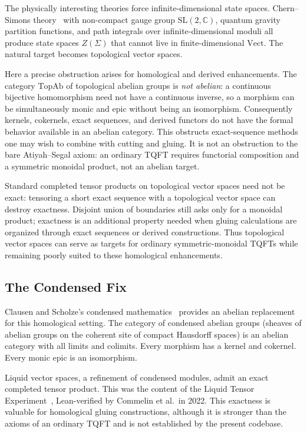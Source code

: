 \documentclass[11pt]{amsart}
\theoremstyle{plain}
\theoremstyle{definition}
\newcommand{\Vect}{\mathrm{Vect}}
\newcommand{\TopAb}{\mathrm{TopAb}}
\begin{document}
The physically interesting theories force infinite-dimensional state spaces. Chern--Simons theory~\cite{Witten1988} with non-compact gauge group $\mathrm{SL}(2,\mathbb{C})$, quantum gravity partition functions, and path integrals over infinite-dimensional moduli all produce state spaces $Z(\Sigma)$ that cannot live in finite-dimensional $\Vect$. The natural target becomes topological vector spaces.

Here a precise obstruction arises for homological and derived enhancements. The category $\TopAb$ of topological abelian groups is \emph{not abelian}: a continuous bijective homomorphism need not have a continuous inverse, so a morphism can be simultaneously monic and epic without being an isomorphism. Consequently kernels, cokernels, exact sequences, and derived functors do not have the formal behavior available in an abelian category. This obstructs exact-sequence methods one may wish to combine with cutting and gluing. It is not an obstruction to the bare Atiyah--Segal axiom: an ordinary TQFT requires functorial composition and a symmetric monoidal product, not an abelian target.

Standard completed tensor products on topological vector spaces need not be exact: tensoring a short exact sequence with a topological vector space can destroy exactness. Disjoint union of boundaries still asks only for a monoidal product; exactness is an additional property needed when gluing calculations are organized through exact sequences or derived constructions. Thus topological vector spaces can serve as targets for ordinary symmetric-monoidal TQFTs while remaining poorly suited to these homological enhancements.

\subsection{The Condensed Fix}

Clausen and Scholze's condensed mathematics~\cite{Scholze2019} provides an abelian replacement for this homological setting. The category of condensed abelian groups (sheaves of abelian groups on the coherent site of compact Hausdorff spaces) is an abelian category with all limits and colimits. Every morphism has a kernel and cokernel. Every monic epic is an isomorphism.

Liquid vector spaces, a refinement of condensed modules, admit an exact completed tensor product. This was the content of the Liquid Tensor Experiment~\cite{Scholze2021,LTE2022}, Lean-verified by Commelin et al.\ in 2022. This exactness is valuable for homological gluing constructions, although it is stronger than the axioms of an ordinary TQFT and is not established by the present codebase.
\end{document}
